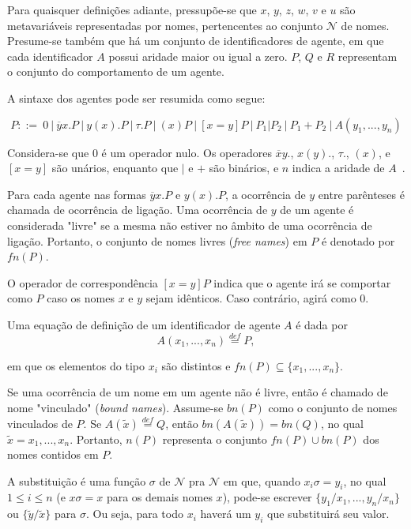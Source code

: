 Para quaisquer definições adiante, pressupõe-se que $x$, $y$, $z$, $w$, $v$ e $u$ são metavariáveis representadas por nomes, pertencentes ao conjunto $\mathcal{N}$ de nomes. Presume-se também que há um conjunto de identificadores de agente, em que cada identificador $A$ possui aridade maior ou igual a zero. $P$, $Q$ e $R$ representam o conjunto do comportamento de um agente.

A sintaxe dos agentes pode ser resumida como segue:

\begin{equation}
P ::=~0~
|~\overline{y}x.P~
|~y(x).P~
|~\tau.P~
|~(x)P~
|~[x = y]P~
|~P_{1}|P_{2}~
|~P_{1} + P_{2}~
|~A(y_{1}, ..., y_{n})
\end{equation}

Considera-se que $0$ é um operador nulo. Os operadores $\overline{x}y.$, $x(y).$, $\tau.$, $(x)$, e $[x=y]$ são unários, enquanto que $|$ e $+$ são binários, e $n$ indica a aridade de $A$~\cite{milner1992calculus2}. 

Para cada agente nas formas $\overline{y}x.P$ e $y(x).P$, a ocorrência de $y$ entre parênteses é chamada de ocorrência de ligação. Uma ocorrência de $y$ de um agente é considerada "livre" se a mesma não estiver no âmbito de uma ocorrência de ligação. Portanto, o conjunto de nomes livres (\textit{free names}) em $P$ é denotado por $fn(P)$.

O operador de correspondência $[x = y]P$ indica que o agente irá se comportar como $P$ caso os nomes $x$ e $y$ sejam idênticos. Caso contrário, agirá como $0$.

Uma equação de definição de um identificador de agente $A$ é dada por $$A(x_{1}, ..., x_{n})\stackrel{def}{=}P,$$

em que os elementos do tipo $x_{i}$ são distintos e $fn(P)\subseteq \{x_{1}, ..., x_{n}\}$.

Se uma ocorrência de um nome em um agente não é livre, então é chamado de nome "vinculado" (\textit{bound names}). Assume-se $bn(P)$ como o conjunto de nomes vinculados de $P$. Se $A (\tilde{x})\stackrel{def}{=} Q$, então $bn(A (\tilde{x})) = bn(Q)$, no qual $\tilde{x} = x_{1}, ..., x_{n}$. Portanto, $n(P)$ representa o conjunto $fn(P) \cup bn(P)$ dos nomes contidos em $P$.

A substituição é uma função $\sigma$ de $\mathcal{N}$ pra $\mathcal{N}$ em que, quando $x_{i}\sigma = y_{i}$, no qual $1\leq i \leq n$ (e $x\sigma = x$ para os demais nomes $x$), pode-se escrever $\{y_{1}/x_{1}, ..., y_{n}/x_{n}\}$ ou $\{\tilde{y}/\tilde{x}\}$ para $\sigma$. Ou seja, para todo $x_{i}$ haverá um $y_{i}$ que substituirá seu valor.

